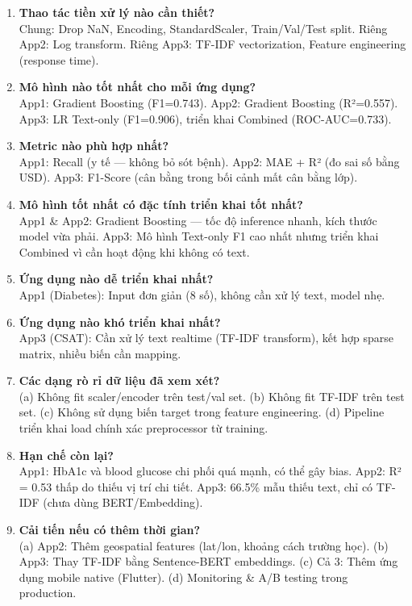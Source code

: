 \documentclass[12pt, a4paper]{article}
\begin{document}
\begin{enumerate}
    \item \textbf{Thao tác tiền xử lý nào cần thiết?} \\
    Chung: Drop NaN, Encoding, StandardScaler, Train/Val/Test split. Riêng App2: Log transform. Riêng App3: TF-IDF vectorization, Feature engineering (response time).

    \item \textbf{Mô hình nào tốt nhất cho mỗi ứng dụng?} \\
    App1: Gradient Boosting (F1=0.743). App2: Gradient Boosting (R²=0.557). App3: LR Text-only (F1=0.906), triển khai Combined (ROC-AUC=0.733).

    \item \textbf{Metric nào phù hợp nhất?} \\
    App1: Recall (y tế — không bỏ sót bệnh). App2: MAE + R² (đo sai số bằng USD). App3: F1-Score (cân bằng trong bối cảnh mất cân bằng lớp).

    \item \textbf{Mô hình tốt nhất có đặc tính triển khai tốt nhất?} \\
    App1 \& App2: Gradient Boosting — tốc độ inference nhanh, kích thước model vừa phải. App3: Mô hình Text-only F1 cao nhất nhưng triển khai Combined vì cần hoạt động khi không có text.

    \item \textbf{Ứng dụng nào dễ triển khai nhất?} \\
    App1 (Diabetes): Input đơn giản (8 số), không cần xử lý text, model nhẹ.

    \item \textbf{Ứng dụng nào khó triển khai nhất?} \\
    App3 (CSAT): Cần xử lý text realtime (TF-IDF transform), kết hợp sparse matrix, nhiều biến cần mapping.

    \item \textbf{Các dạng rò rỉ dữ liệu đã xem xét?} \\
    (a) Không fit scaler/encoder trên test/val set. (b) Không fit TF-IDF trên test set. (c) Không sử dụng biến target trong feature engineering. (d) Pipeline triển khai load chính xác preprocessor từ training.

    \item \textbf{Hạn chế còn lại?} \\
    App1: HbA1c và blood glucose chi phối quá mạnh, có thể gây bias. App2: R² = 0.53 thấp do thiếu vị trí chi tiết. App3: 66.5\% mẫu thiếu text, chỉ có TF-IDF (chưa dùng BERT/Embedding).

    \item \textbf{Cải tiến nếu có thêm thời gian?} \\
    (a) App2: Thêm geospatial features (lat/lon, khoảng cách trường học). (b) App3: Thay TF-IDF bằng Sentence-BERT embeddings. (c) Cả 3: Thêm ứng dụng mobile native (Flutter). (d) Monitoring \& A/B testing trong production.
\end{enumerate}
\end{document}
